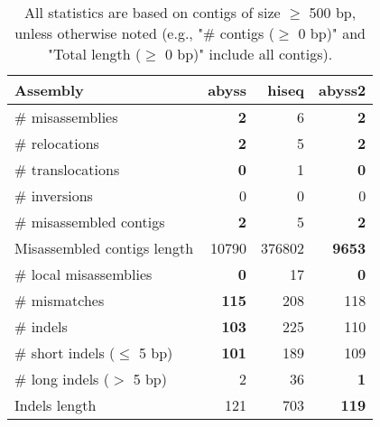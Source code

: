 \documentclass[12pt,a4paper]{article}
\begin{document}
\begin{table}[ht]
\begin{center}
\caption{All statistics are based on contigs of size $\geq$ 500 bp, unless otherwise noted (e.g., "\# contigs ($\geq$ 0 bp)" and "Total length ($\geq$ 0 bp)" include all contigs).}
\begin{tabular}{|l*{3}{|r}|}
\hline
Assembly & abyss & hiseq & abyss2 \\ \hline
\# misassemblies & {\bf 2} & 6 & {\bf 2} \\ \hline
\hspace{5mm}\# relocations & {\bf 2} & 5 & {\bf 2} \\ \hline
\hspace{5mm}\# translocations & {\bf 0} & 1 & {\bf 0} \\ \hline
\hspace{5mm}\# inversions & 0 & 0 & 0 \\ \hline
\# misassembled contigs & {\bf 2} & 5 & {\bf 2} \\ \hline
Misassembled contigs length & 10790 & 376802 & {\bf 9653} \\ \hline
\# local misassemblies & {\bf 0} & 17 & {\bf 0} \\ \hline
\# mismatches & {\bf 115} & 208 & 118 \\ \hline
\# indels & {\bf 103} & 225 & 110 \\ \hline
\hspace{5mm}\# short indels ($\leq$ 5 bp) & {\bf 101} & 189 & 109 \\ \hline
\hspace{5mm}\# long indels ($>$ 5 bp) & 2 & 36 & {\bf 1} \\ \hline
Indels length & 121 & 703 & {\bf 119} \\ \hline
\end{tabular}
\end{center}
\end{table}
\end{document}
